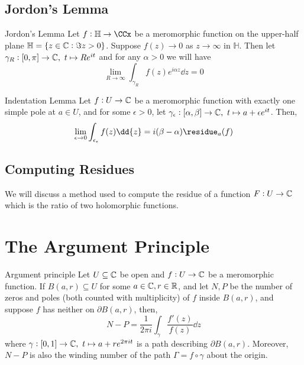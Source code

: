 \documentclass{styles/tufte}
\begin{document}
\subsection{Jordon's Lemma}
  
  \begin{lemma}{Jordon's Lemma}{}
    Let $f: \mathbb{H} \to \CCx$ be a meromorphic function on the upper-half plane $\mathbb{H} = \set{z \in \mathbb{C}: \Im z > 0}$. Suppose $f(z) \to 0$ as $z \to \infty$ in $\mathbb{H}$. Then let $\gamma_R: [0, \pi] \to \mathbb{C},\ t \mapsto Re^{it}$ and for any $\alpha > 0$ we will have
    \[ \lim_{R \to \infty} \int_{\gamma_R} f(z) e^{i\alpha z} \dd{z} = 0 \]
  \end{lemma}
  
  \begin{lemma}{Indentation Lemma}{}
    Let $f: U \to \mathbb{C}$ be a meromorphic function with exactly one simple pole at $a \in U$, and for some $\epsilon > 0$, let $\gamma_\epsilon: [\alpha, \beta] \to \CC,\ t \mapsto a + \epsilon e^{it}$. Then,
    \[ \lim_{\epsilon \to 0} \int_{\epsilon_\epsilon} f(z) \dd{z} = i (\beta - \alpha) \residue_a(f) \]
  \end{lemma}


\subsection{Computing Residues}
  
  We will discuss a method used to compute the residue of a function $F: U \to \mathbb{C}$ which is the ratio of two holomorphic functions.
  
  \begin{example}{}{}
    
  \end{example}



\section{The Argument Principle}

\begin{theorem}{Argument principle}{}
  Let $U \subseteq \mathbb{C}$ be open and $f: U \to \mathbb{C}$ be a meromorphic function. If $B(a, r) \subseteq U$ for some $a \in \mathbb{C}, r \in \mathbb{R}$, and let $N, P$ be the number of zeros and poles (both counted with multiplicity) of $f$ inside $B(a, r)$, and suppose $f$ has neither on $\partial B(a, r)$, then,
  \[ N - P = \frac{1}{2\pi i} \int_\gamma \frac{f'(z)}{f(z)} \dd{z} \]
  where $\gamma: [0, 1] \to \mathbb{C},\ t \mapsto a + re^{2\pi it}$ is a path describing $\partial B(a, r)$. Moreover, $N - P$ is also the winding number of the path $\Gamma = f \circ \gamma$ about the origin.
\end{theorem}
\end{document}
